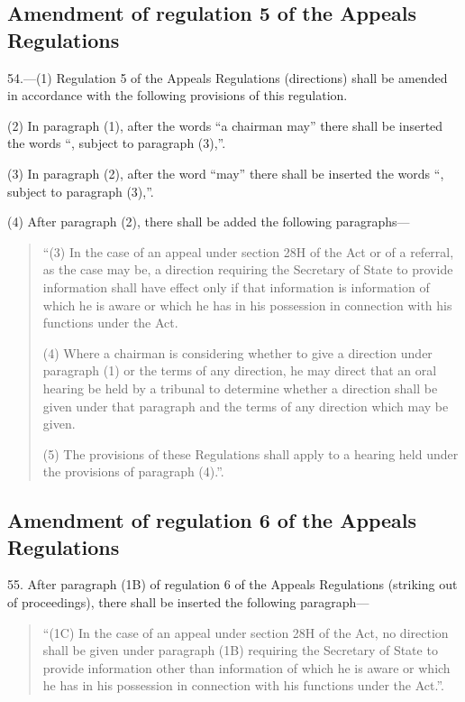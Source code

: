 \documentclass[12pt,a4paper]{article}
\begin{document}
\subsection[54. Amendment of regulation 5 of the Appeals Regulations]{Amendment of regulation 5 of the Appeals Regulations}

54.—(1) Regulation 5 of the
Appeals Regulations (directions) shall be amended in accordance with the
following provisions of this regulation.

(2) In paragraph (1), after the words “a chairman may” there shall be inserted
the words “, subject to paragraph (3),”.

(3) In paragraph (2), after the word “may” there shall be inserted the words “,
subject to paragraph (3),”.

(4) After paragraph (2), there shall be added the following paragraphs—
\begin{quotation}
“(3) In the case of an appeal under section 28H of the Act or of a referral, as
the case may be, a direction requiring the Secretary of State to provide
information shall have effect only if that information is information of which
he is aware or which he has in his possession in connection with his functions
under the Act.

(4) Where a chairman is considering whether to give a direction under paragraph
(1) or the terms of any direction, he may direct that an oral hearing be held by
a tribunal to determine whether a direction shall be given under that paragraph
and the terms of any direction which may be given.

(5) The provisions of these Regulations shall apply to a hearing held under the
provisions of paragraph (4).”.
\end{quotation}

\subsection[55. Amendment of regulation 6 of the Appeals Regulations]{Amendment of regulation 6 of the Appeals Regulations}

55. After paragraph (1B) of
regulation 6 of the Appeals Regulations (striking out of proceedings), there
shall be inserted the following paragraph—
\begin{quotation}
“(1C) In the case of an appeal under section 28H of the Act, no direction shall
be given under paragraph (1B) requiring the Secretary of State to provide
information other than information of which he is aware or which he has in his
possession in connection with his functions under the Act.”.
\end{quotation}
\end{document}
